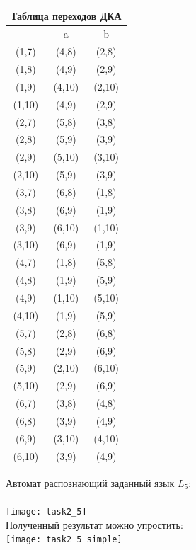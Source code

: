 \documentclass{article}
\begin{document}
\begin{center}
\begin{tabular} {|c |c |c|}
\hline
\multicolumn{3}{|c|}{Таблица переходов ДКА} \\
\hline
 & a & b \\
\hline
(1,7) & (4,8) & (2,8) \\
\hline
(1,8) & (4,9) & (2,9) \\
\hline
(1,9) & (4,10) & (2,10) \\
\hline
(1,10) & (4,9) & (2,9) \\
\hline
\hline
(2,7) & (5,8) & (3,8) \\
\hline
(2,8) & (5,9) & (3,9) \\
\hline
(2,9) & (5,10) & (3,10) \\
\hline
(2,10) & (5,9) & (3,9) \\
\hline
\hline
(3,7) & (6,8) & (1,8) \\
\hline
(3,8) & (6,9) & (1,9) \\
\hline
(3,9) & (6,10) & (1,10) \\
\hline
(3,10) & (6,9) & (1,9) \\
\hline
\hline
(4,7) & (1,8) & (5,8) \\
\hline
(4,8) & (1,9) & (5,9) \\
\hline
(4,9) & (1,10) & (5,10) \\
\hline
(4,10) & (1,9) & (5,9) \\
\hline
\hline
(5,7) & (2,8) & (6,8) \\
\hline
(5,8) & (2,9) & (6,9) \\
\hline
(5,9) & (2,10) & (6,10) \\
\hline
(5,10) & (2,9) & (6,9) \\
\hline
\hline
(6,7) & (3,8) & (4,8) \\
\hline
(6,8) & (3,9) & (4,9) \\
\hline
(6,9) & (3,10) & (4,10) \\
\hline
(6,10) & (3,9) & (4,9) \\
\hline
\end{tabular}
\end{center}
\normalsize{Автомат распознающий заданный язык \(L_5\): }\\\\
\texttt{[image: task2\_5]}\\
\hfill \break
\normalsize{Полученный результат можно упростить:}\\
\hfill \break
\texttt{[image: task2\_5\_simple]}\\
\end{document}
